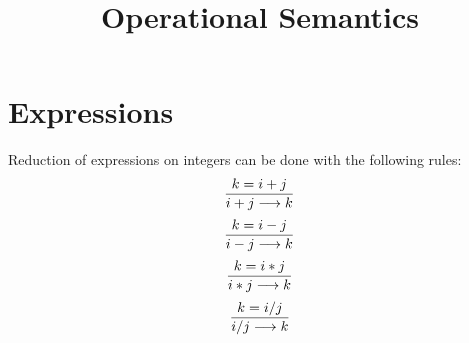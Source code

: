 \documentclass[a4paper, 12pt]{report}
\title{\Large{Operational Semantics}}
\begin{document}
\maketitle

\section{Expressions}

Reduction of expressions on integers can be done with the following rules:
$$
{{{k} = {i + j}}\over{{i+j}\longrightarrow{k}}}
$$
$$
{{{k} = {i - j}}\over{{i-j}\longrightarrow{k}}}
$$
$$
{{{k} = {i * j}}\over{{i*j}\longrightarrow{k}}}
$$
$$
{{{k} = {i / j}}\over{{i/j}\longrightarrow{k}}}
$$
\end{document}
